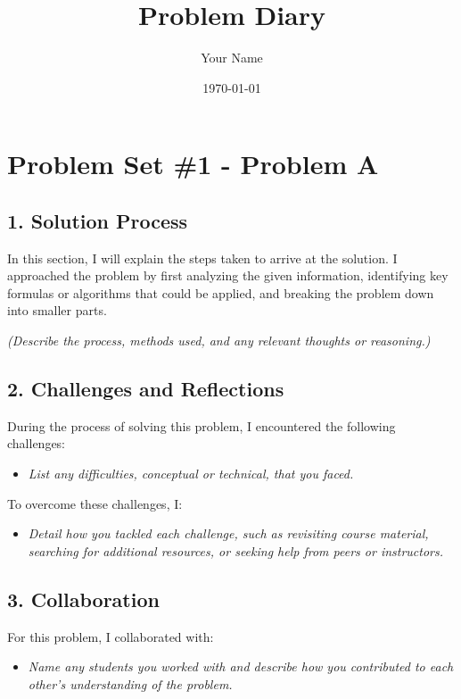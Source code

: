 \documentclass[a4paper,12pt]{article}
\title{Problem Diary}
\author{Your Name}
\date{\today}
\begin{document}
\maketitle

\section*{Problem Set \#1 - Problem A}

\subsection*{1. Solution Process}
In this section, I will explain the steps taken to arrive at the solution. I approached the problem by first analyzing the given information, identifying key formulas or algorithms that could be applied, and breaking the problem down into smaller parts.

\textit{(Describe the process, methods used, and any relevant thoughts or reasoning.)}

\subsection*{2. Challenges and Reflections}
During the process of solving this problem, I encountered the following challenges:
\begin{itemize}
    \item \textit{List any difficulties, conceptual or technical, that you faced.}
\end{itemize}

To overcome these challenges, I:
\begin{itemize}
    \item \textit{Detail how you tackled each challenge, such as revisiting course material, searching for additional resources, or seeking help from peers or instructors.}
\end{itemize}

\subsection*{3. Collaboration}
For this problem, I collaborated with:
\begin{itemize}
    \item \textit{Name any students you worked with and describe how you contributed to each other's understanding of the problem.}
\end{itemize}
\end{document}
